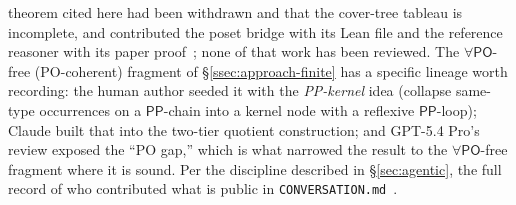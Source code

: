 \documentclass[11pt]{article}
\newcommand{\PO}{\mathsf{PO}}
\newcommand{\PP}{\mathsf{PP}}
\theoremstyle{plain}
\theoremstyle{definition}
\begin{document}
theorem cited here had been withdrawn and that the cover-tree tableau is
incomplete, and contributed the poset bridge with its Lean file and the
reference reasoner with its paper
proof~\cite{PosetBridgeNote,MideloraNote}; none of that work has been
reviewed. The $\forall\PO$-free (PO-coherent) fragment
of \S\ref{ssec:approach-finite} has a specific lineage worth recording: the
human author seeded it with the \emph{PP-kernel} idea (collapse
same-type occurrences on a $\PP$-chain into a kernel node with a reflexive
$\PP$-loop); Claude built that into the two-tier quotient construction; and
GPT-5.4 Pro's review exposed the ``PO gap,'' which is what narrowed the
result to the $\forall\PO$-free fragment where it is sound. Per the
discipline described in \S\ref{sec:agentic}, the full record of who
contributed what is public in \texttt{CONVERSATION.md}~\cite{ConversationLog}.
\end{document}
